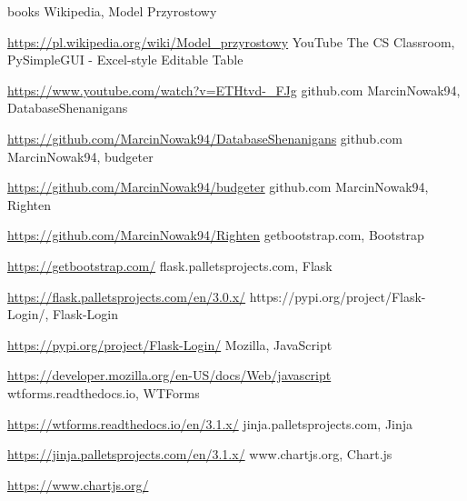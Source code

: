 \documentclass[a4paper,10pt, twoside]{report}
\begin{document}
\begin{large}
\begin{thebibliography} {books}
     Wikipedia, Model Przyrostowy \raggedright\url{
        https://pl.wikipedia.org/wiki/Model_przyrostowy}
     YouTube The CS Classroom, PySimpleGUI - Excel-style Editable Table \raggedright\url{
        https://www.youtube.com/watch?v=ETHtvd-_FJg}
     github.com MarcinNowak94, DatabaseShenanigans \raggedright\url{
        https://github.com/MarcinNowak94/DatabaseShenanigans}
     github.com MarcinNowak94, budgeter \raggedright\url{
        https://github.com/MarcinNowak94/budgeter}
     github.com MarcinNowak94, Righten \raggedright\url{
        https://github.com/MarcinNowak94/Righten}
     getbootstrap.com, Bootstrap \raggedright\url{
        https://getbootstrap.com/}
     flask.palletsprojects.com, Flask \raggedright\url{
        https://flask.palletsprojects.com/en/3.0.x/}
     https://pypi.org/project/Flask-Login/, Flask-Login \raggedright\url{
        https://pypi.org/project/Flask-Login/}
     Mozilla, JavaScript \raggedright\url{
        https://developer.mozilla.org/en-US/docs/Web/javascript}   
     wtforms.readthedocs.io, WTForms \raggedright\url{
        https://wtforms.readthedocs.io/en/3.1.x/}
     jinja.palletsprojects.com, Jinja \raggedright\url{
        https://jinja.palletsprojects.com/en/3.1.x/}
     www.chartjs.org, Chart.js \raggedright\url{
        https://www.chartjs.org/}      
\end{thebibliography}

\listoffigures
\listoftables
\lstlistoflistings

\end{large}
\end{document}
